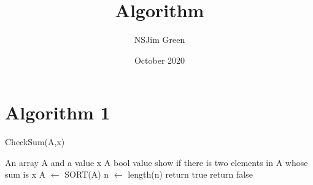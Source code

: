 \documentclass{article}
\title{Algorithm}
\author{NSJim Green}
\date{October 2020}
\begin{document}
\maketitle

\section{Algorithm 1}

\begin{algorithm}
\caption{CheckSum(A,x)} %
\label{alg2} %
\begin{algorithmic} %
 An array A and a value x  %
 A bool value show if there is two elements in A whose sum is x
\STATE A $\gets$ SORT(A)
\STATE n $\gets$ length(n)
    \STATE return true
    \ENDIF
\ENDFOR
\STATE return false
\end{algorithmic}
\end{algorithm}
\end{document}
